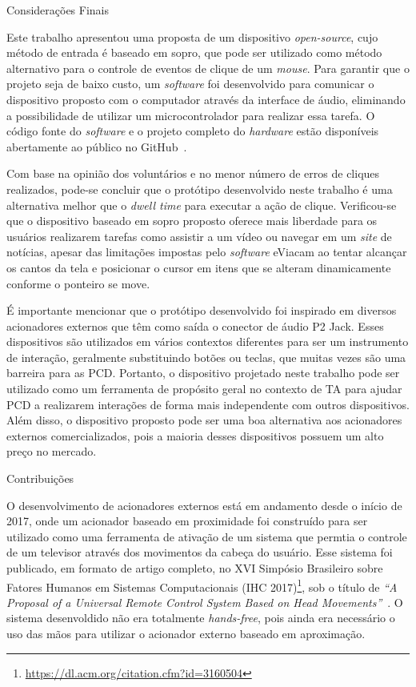 \begin{chapter}{Considerações Finais}

Este trabalho apresentou uma proposta de um dispositivo \textit{open-source},
cujo método de entrada é baseado em sopro, que pode ser utilizado como método
alternativo para o controle de eventos de clique de um \textit{mouse}. Para
garantir que o projeto seja de baixo custo, um \textit{software} foi desenvolvido
para comunicar o dispositivo proposto com o computador através da interface de
áudio, eliminando a possibilidade de utilizar um microcontrolador para realizar
essa tarefa. O código fonte do \textit{software} e o projeto completo do
\textit{hardware} estão disponíveis abertamente ao público no 
GitHub~\cite{ErickGit}.

Com base na opinião dos voluntários e no menor número de erros de cliques
realizados, pode-se concluir que o protótipo desenvolvido neste trabalho é uma
alternativa melhor que o \textit{dwell time} para executar a ação
de clique. Verificou-se que o dispositivo baseado em sopro proposto oferece mais
liberdade para os usuários realizarem tarefas como assistir a um vídeo ou
navegar em um \textit{site} de notícias, apesar das limitações impostas pelo
\textit{software} eViacam ao tentar alcançar os cantos da tela e posicionar o
cursor em itens que se alteram dinamicamente conforme o ponteiro se move.

É importante mencionar que o protótipo desenvolvido foi inspirado em diversos
acionadores externos que têm como saída o conector de áudio P2 Jack. Esses
dispositivos são utilizados em vários contextos diferentes para ser um
instrumento de interação, geralmente substituindo botões ou teclas, que muitas
vezes são uma barreira para as PCD. Portanto, o dispositivo projetado neste
trabalho pode ser utilizado como um ferramenta de propósito geral no contexto de
TA para ajudar PCD a realizarem interações de forma mais
independente com outros dispositivos. Além disso, o dispositivo proposto pode
ser uma boa alternativa aos acionadores externos comercializados, pois a maioria
desses dispositivos possuem um alto preço no mercado.

\begin{section}{Contribuições}

O desenvolvimento de acionadores externos está em andamento desde o início de 2017,
onde um acionador baseado em proximidade foi construído para ser utilizado como
uma ferramenta de ativação de um sistema que permtia o controle de um televisor
através dos movimentos da cabeça do usuário. Esse sistema foi publicado, em
formato de artigo completo, no XVI Simpósio Brasileiro sobre Fatores Humanos em
Sistemas Computacionais (IHC
2017)\footnote{\url{https://dl.acm.org/citation.cfm?id=3160504}}, sob o
título de \textit{``A Proposal  of a Universal Remote Control System Based on Head
Movements''}~\cite{Erick17}. O sistema desenvoldido não era totalmente
\textit{hands-free}, pois ainda era necessário o uso das mãos para utilizar o
acionador externo baseado em aproximação.


\end{section}
\end{chapter}
